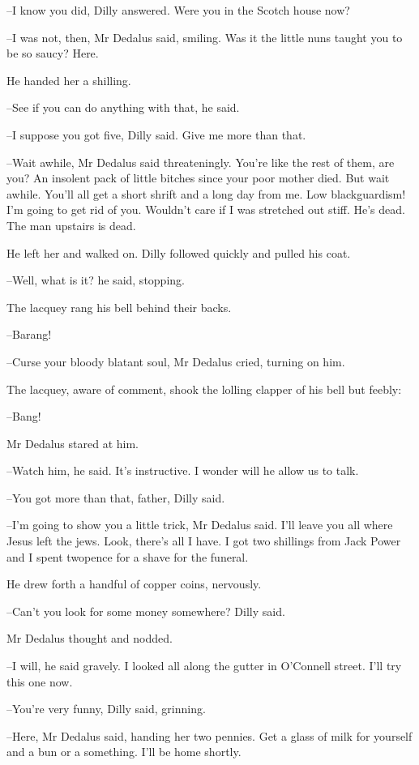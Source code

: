 --I know you did,
Dilly answered.
Were you in the Scotch house now?

--I was not, then,
Mr Dedalus said, smiling.
Was it the little nuns
taught you to be so saucy?
Here.

He handed her a shilling.

--See if you can do anything with that,
he said.

--I suppose you got five,
Dilly said.
Give me more than that.

--Wait awhile,
Mr Dedalus said threateningly.
You're like the rest of
them, are you?
An insolent pack of little bitches since your poor mother
died.
But wait awhile.
You'll all get a short shrift and a long day from
me.
Low blackguardism!
I'm going to get rid of you.
Wouldn't care if I
was stretched out stiff.
He's dead.
The man upstairs is dead.

He left her and walked on.
Dilly followed quickly and pulled his coat.

--Well, what is it?
he said, stopping.

The lacquey rang his bell behind their backs.

--Barang!

--Curse your bloody blatant soul,
Mr Dedalus cried,
turning on him.

The lacquey,
aware of comment,
shook the lolling clapper of his bell
but feebly:

--Bang!

Mr Dedalus stared at him.

--Watch him,
he said.
It's instructive.
I wonder will he allow us to talk.

--You got more than that, father,
Dilly said.

--I'm going to show you a little trick,
Mr Dedalus said.
I'll leave you
all where Jesus left the jews.
Look, there's all I have.
I got two
shillings from Jack Power
and I spent twopence for a shave for the
funeral.

He drew forth a handful of copper coins,
nervously.

--Can't you look for some money somewhere?
Dilly said.

Mr Dedalus thought and nodded.

--I will,
he said gravely.
I looked all along the gutter in O'Connell
street.
I'll try this one now.

--You're very funny,
Dilly said, grinning.

--Here,
Mr Dedalus said,
handing her two pennies.
Get a glass of milk for
yourself
and a bun or a something.
I'll be home shortly.

